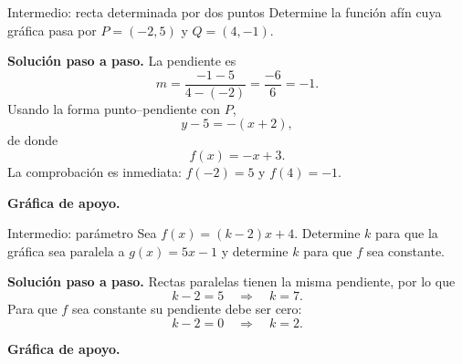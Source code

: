 \documentclass[aspectratio=169,10pt]{beamer}
\begin{document}
\begin{frame}{Intermedio: recta determinada por dos puntos}
Determine la función afín cuya gráfica pasa por $P=(-2,5)$ y $Q=(4,-1)$.

\textbf{Solución paso a paso.} La pendiente es
\[
m=\frac{-1-5}{4-(-2)}=\frac{-6}{6}=-1.
\]
Usando la forma punto--pendiente con $P$,
\[
y-5=-(x+2),
\]
de donde
\[
\boxed{f(x)=-x+3}.
\]
La comprobación es inmediata: $f(-2)=5$ y $f(4)=-1$.


\textbf{Gráfica de apoyo.}\medskip
\begin{center}
\end{center}

\end{frame}

\begin{frame}{Intermedio: parámetro}
Sea $f(x)=(k-2)x+4$. Determine $k$ para que la gráfica sea paralela a $g(x)=5x-1$ y determine $k$ para que $f$ sea constante.

\textbf{Solución paso a paso.} Rectas paralelas tienen la misma pendiente, por lo que
\[
k-2=5\quad\Longrightarrow\quad \boxed{k=7}.
\]
Para que $f$ sea constante su pendiente debe ser cero:
\[
k-2=0\quad\Longrightarrow\quad \boxed{k=2}.
\]


\textbf{Gráfica de apoyo.}\medskip
\begin{center}
\end{center}

\end{frame}
\end{document}
